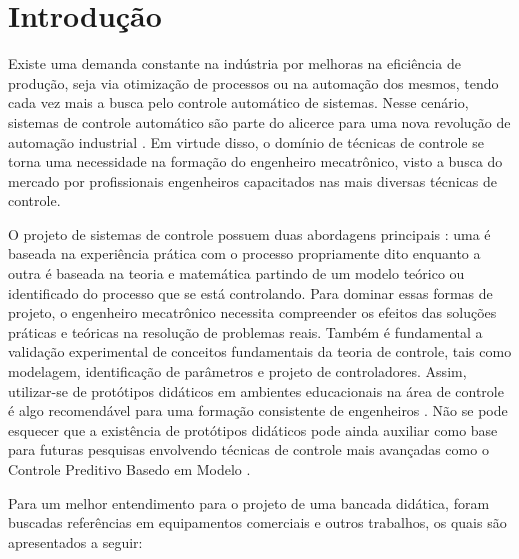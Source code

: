 \chapter[Introdução]{Introdução}
Existe uma demanda constante na indústria por melhoras na eficiência de produção, seja via otimização de processos ou na automação dos mesmos, tendo cada vez mais a busca pelo controle automático de sistemas. Nesse cenário, sistemas de controle automático são parte do alicerce para uma nova revolução de automação industrial \cite{bencomo2002control}. Em virtude disso, o domínio de técnicas de controle se torna uma necessidade na formação do engenheiro mecatrônico, visto a busca do mercado por profissionais engenheiros capacitados nas mais diversas técnicas de controle.

O projeto de sistemas de controle possuem duas abordagens principais \cite{kheir1996control}: uma é baseada na experiência prática com o processo propriamente dito enquanto a outra é baseada na teoria e matemática partindo de um modelo teórico ou identificado do processo que se está controlando. Para dominar essas formas de projeto, o engenheiro mecatrônico necessita compreender os efeitos das soluções práticas e teóricas na resolução de problemas reais. Também é fundamental a validação experimental de conceitos fundamentais da teoria de controle, tais como modelagem, identificação de parâmetros e projeto de controladores. Assim, utilizar-se de protótipos didáticos em ambientes educacionais na área de controle é algo recomendável para uma formação consistente de engenheiros \cite{silva2001midias}. Não se pode esquecer que a existência de protótipos didáticos pode ainda auxiliar como base para futuras pesquisas envolvendo técnicas de controle mais avançadas como o Controle Preditivo Basedo em Modelo \cite{normey2024controle}.

Para um melhor entendimento para o projeto de uma bancada didática, foram buscadas referências em equipamentos comerciais e outros trabalhos, os quais são apresentados a seguir:  

